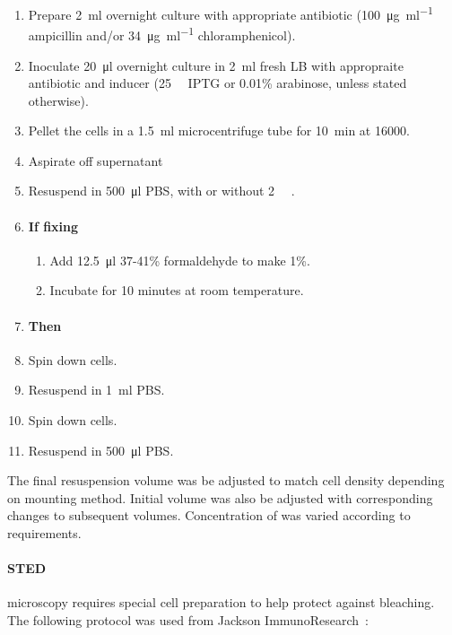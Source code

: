 \documentclass[../main.tex]{subfiles}
\begin{document}
\begin{enumerate}
\item Prepare \SI{2}{\milli\litre} overnight culture with appropriate antibiotic (\SI{100}{\micro\gram\per\milli\litre} ampicillin and/or \SI{34}{\micro\gram\per\milli\litre} chloramphenicol).
\item Inoculate \SI{20}{\micro\litre} overnight culture in \SI{2}{\milli\litre} fresh LB with appropraite antibiotic and inducer (\SI{25}{\micro\molar} IPTG or 0.01\% arabinose, unless stated otherwise).
\item Pellet the cells in a \SI{1.5}{\milli\litre} microcentrifuge tube for \SI{10}{\minute} at \SI{16000}{\grav}.
\item Aspirate off supernatant
\item Resuspend in \SI{500}{\micro\litre} PBS, with or without \SI{2}{\milli\Molar} .
\item \paragraph{If fixing}
\begin{enumerate}
\item Add \SI{12.5}{\micro\litre} 37-41\% formaldehyde to make 1\%.
\item Incubate for 10 minutes at room temperature.
\end{enumerate}
\item[] \paragraph{Then}
\item Spin down cells.
\item Resuspend in \SI{1}{\milli\litre} PBS.
\item Spin down cells.
\item Resuspend in \SI{500}{\micro\litre} PBS.
\end{enumerate}

The final resuspension volume was be adjusted to match cell density depending on mounting method. Initial volume was also be adjusted with corresponding changes to subsequent volumes. Concentration of  was varied according to requirements.

\paragraph{STED} microscopy requires special cell preparation to help protect against bleaching. The following protocol was used from Jackson ImmunoResearch~\citep{jackson}:
\end{document}
